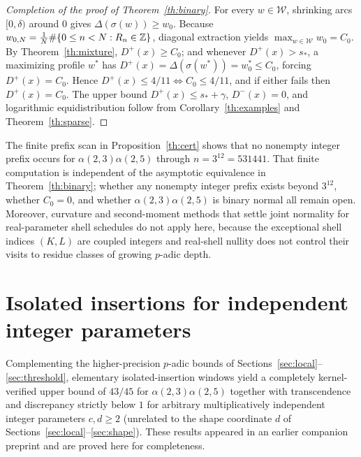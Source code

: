 \documentclass[11pt]{article}
\begin{document}
\begin{proof}[Completion of the proof of Theorem~\ref{th:binary}]
For every $w\in\mathcal W$, shrinking arcs $[0,\delta)$ around $0$ gives $\Delta(\sigma(w))\ge w_0$. Because $w_{0,N}=\frac1N\#\{0\le n<N:R_n\in\mathbb Z\}$, diagonal extraction yields $\max_{w\in\mathcal W} w_0=C_0$. By Theorem~\ref{th:mixture}, $D^+(x)\ge C_0$; and whenever $D^+(x)>s_*$, a maximizing profile $w^*$ has $D^+(x)=\Delta(\sigma(w^*))=w_0^*\le C_0$, forcing $D^+(x)=C_0$. Hence $D^+(x)\le4/11\iff C_0\le4/11$, and if either fails then $D^+(x)=C_0$. The upper bound $D^+(x)\le s_*+\gamma$, $D^-(x)=0$, and logarithmic equidistribution follow from Corollary~\ref{th:examples} and Theorem~\ref{th:sparse}.
\end{proof}

\begin{remark}
The finite prefix scan in Proposition~\ref{th:cert} shows that no nonempty integer prefix occurs for $\alpha(2,3)\alpha(2,5)$ through $n=3^{12}=531441$. That finite computation is independent of the asymptotic equivalence in Theorem~\ref{th:binary}; whether any nonempty integer prefix exists beyond $3^{12}$, whether $C_0=0$, and whether $\alpha(2,3)\alpha(2,5)$ is binary normal all remain open. Moreover, curvature and second-moment methods that settle joint normality for real-parameter shell schedules do not apply here, because the exceptional shell indices $(K,L)$ are coupled integers and real-shell nullity does not control their visits to residue classes of growing $p$-adic depth.
\end{remark}

\section{Isolated insertions for independent integer parameters}\label{sec:isolated}
Complementing the higher-precision $p$-adic bounds of Sections~\ref{sec:local}--\ref{sec:threshold}, elementary isolated-insertion windows yield a completely kernel-verified upper bound of $43/45$ for $\alpha(2,3)\alpha(2,5)$ together with transcendence and discrepancy strictly below $1$ for arbitrary multiplicatively independent integer parameters $c,d\ge2$ (unrelated to the shape coordinate $d$ of Sections~\ref{sec:local}--\ref{sec:shape}). These results appeared in an earlier companion preprint \cite{paper1v1} and are proved here for completeness.
\end{document}
